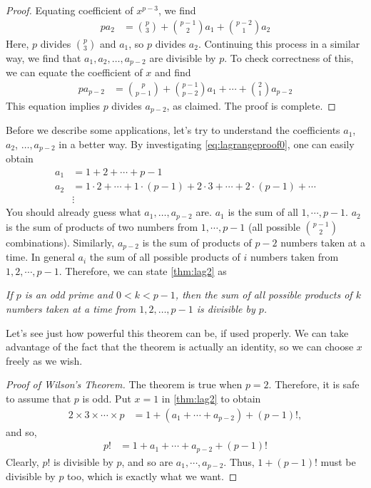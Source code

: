 \documentclass[12pt]{subfile}
\begin{document}
\begin{proof}[Proof]
			Equating coefficient of $x^{p-3}$, we find
				\begin{align*}
					pa_2
						& = \binom{p}{3}+\binom{p-1}{2}a_1+\binom{p-2}{1}a_2
				\end{align*}
			Here, $p$ divides $\binom{p}{3}$ and $a_1$, so $p$ divides $a_2$. Continuing this process in a similar way, we find that $a_1, a_2, \ldots, a_{p-2}$ are divisible by $p$. To check correctness of this, we can equate the coefficient of $x$ and find
				\begin{align*}
					pa_{p-2}
						& = \binom{p}{p-1}+\binom{p-1}{p-2}a_1+\cdots+\binom{2}{1}a_{p-2}
				\end{align*}
			This equation implies $p$ divides $a_{p-2}$, as claimed. The proof is complete.
		\end{proof}
	Before we describe some applications, let's try to understand the coefficients $a_1$, $a_2$, $\ldots,a_{p-2}$ in a better way. By investigating \eqref{eq:lagrangeproof0}, one can easily obtain
		\begin{align*}
			a_1 & = 1+2+\cdots+p-1\\
			a_2 & = 1\cdot2+\cdots+1\cdot(p-1)+2\cdot3+\cdots+2\cdot(p-1)+\cdots\\
				&  \vdots
		\end{align*}
	You should already guess what $a_1,\ldots,a_{p-2}$ are. $a_1$ is the sum of all $1,\cdots,p-1$. $a_2$ is the sum of products of two numbers from $1,\cdots,p-1$ (all possible $\binom{p-1}{2}$ combinations). Similarly, $a_{p-2}$ is the sum of products of $p-2$ numbers taken at a time. In general $a_i$ the sum of all possible products of $i$ numbers taken from $1,2,\cdots,p-1$. Therefore, we can state \autoref{thm:lag2} as
		\begin{theorem}\slshape
			If $p$ is an odd prime and $0<k<p-1$, then the sum of all possible products of $k$ numbers taken at a time from $1,2,\ldots,p-1$ is divisible by $p$.
		\end{theorem}
	Let's see just how powerful this theorem can be, if used properly. We can take advantage of the fact that the theorem is actually an identity, so we can choose $x$ freely as we wish.
		\begin{proof}[Proof of Wilson's Theorem]
			The theorem is true when $p=2$. Therefore, it is safe to assume that $p$ is odd. Put $x=1$ in \autoref{thm:lag2} to obtain
				\begin{align*}
					2\times 3 \times \cdots \times p & = 1+(a_1+\cdots+a_{p-2})+(p-1)!,
				\end{align*}
			and so,
				\begin{align*}
					p! & = 1+a_1+\cdots+a_{p-2}+(p-1)!
				\end{align*}
			Clearly, $p!$ is divisible by $p$, and so are $a_1,\cdots,a_{p-2}$. Thus, $1+(p-1)!$ must be divisible by $p$ too, which is exactly what we want.
		\end{proof}
\end{document}
